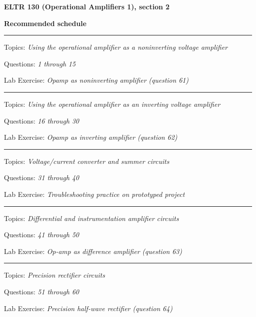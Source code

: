 
\centerline{\bf ELTR 130 (Operational Amplifiers 1), section 2} \bigskip 
 
\vskip 10pt

\noindent
{\bf Recommended schedule}

\vskip 5pt

\hrule \vskip 5pt
\noindent
{}

\hskip 10pt Topics: {\it Using the operational amplifier as a noninverting voltage amplifier}
 
\hskip 10pt Questions: {\it 1 through 15}
 
\hskip 10pt Lab Exercise: {\it Opamp as noninverting amplifier (question 61)}
 

\vskip 10pt
\hrule \vskip 5pt
\noindent
{}

\hskip 10pt Topics: {\it Using the operational amplifier as an inverting voltage amplifier}
 
\hskip 10pt Questions: {\it 16 through 30}
 
\hskip 10pt Lab Exercise: {\it Opamp as inverting amplifier (question 62)}
 
 
\vskip 10pt
\hrule \vskip 5pt
\noindent
{}

\hskip 10pt Topics: {\it Voltage/current converter and summer circuits}
 
\hskip 10pt Questions: {\it 31 through 40}
 
\hskip 10pt Lab Exercise: {\it Troubleshooting practice on prototyped project}
 
\vskip 10pt
\hrule \vskip 5pt
\noindent
{}

\hskip 10pt Topics: {\it Differential and instrumentation amplifier circuits}
 
\hskip 10pt Questions: {\it 41 through 50}
 
\hskip 10pt Lab Exercise: {\it Op-amp as difference amplifier (question 63)}
 
\vskip 10pt
\hrule \vskip 5pt
\noindent
{}

\hskip 10pt Topics: {\it Precision rectifier circuits}
 
\hskip 10pt Questions: {\it 51 through 60}
 
\hskip 10pt Lab Exercise: {\it Precision half-wave rectifier (question 64)}
 
